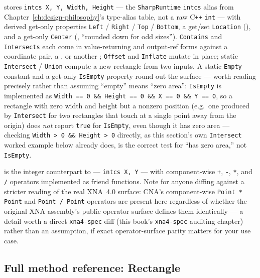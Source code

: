  stores \texttt{intcs X, Y, Width, Height} --- the
\texttt{SharpRuntime} \texttt{intcs} alias from Chapter~\ref{ch:design-philosophy}'s type-alias
table, not a raw C\texttt{++} \texttt{int} --- with derived get-only properties
\texttt{Left} / \texttt{Right} / \texttt{Top} / \texttt{Bottom}, a get/set \texttt{Location}
(), and a get-only \texttt{Center} (, ``rounded down for odd
sizes''). \texttt{Contains} and \texttt{Intersects} each come in value-returning and
output-ref forms against a coordinate pair, a , or another
; \texttt{Offset} and \texttt{Inflate} mutate in place; static
\texttt{Intersect} / \texttt{Union} compute a new rectangle from two inputs. A static
\texttt{Empty} constant and a get-only \texttt{IsEmpty} property round out the surface ---
worth reading precisely rather than assuming ``empty'' means ``zero area'': \texttt{IsEmpty}
is implemented as \texttt{Width == 0 \&\& Height == 0 \&\& X == 0 \&\& Y == 0}, so a rectangle
with zero width and height but a nonzero position (e.g.\ one produced by \texttt{Intersect}
for two rectangles that touch at a single point away from the origin) does \emph{not} report
\texttt{true} for \texttt{IsEmpty}, even though it has zero area --- checking
\texttt{Width > 0 \&\& Height > 0} directly, as this section's own \texttt{Intersect} worked
example below already does, is the correct test for ``has zero area,'' not \texttt{IsEmpty}.

 is the integer counterpart to  --- \texttt{intcs X, Y} ---
with component-wise \texttt{+}, \texttt{-}, \texttt{*}, and \texttt{/} operators implemented
as friend functions. Note for anyone diffing against a stricter reading of the real XNA~4.0
 surface: CNA's component-wise \texttt{Point * Point} and \texttt{Point /
Point} operators are present here regardless of whether the original XNA assembly's public
operator surface defines them identically --- a detail worth a direct \texttt{xna4-spec}
diff (this book's \texttt{xna4-spec} auditing chapter) rather than an assumption, if exact
operator-surface parity matters for your use case.

\subsection{Full method reference: Rectangle}


